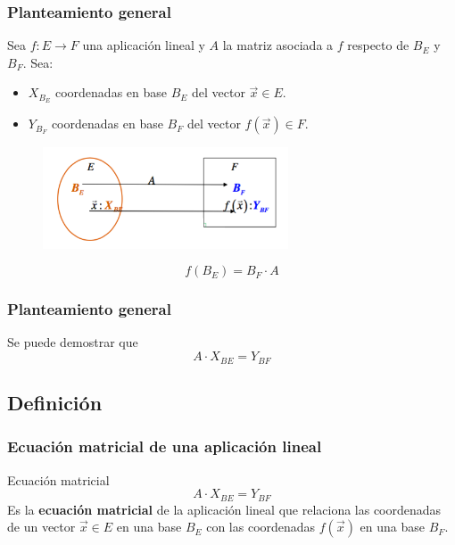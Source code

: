 \documentclass{beamer}
\begin{document}
 
 
    \begin{frame}
  \frametitle{Planteamiento general}
Sea  $f:E\longrightarrow F$ una aplicaci\'on lineal y $A$ la matriz asociada a $f$ respecto de $B_E$ y $B_F$. Sea:
\begin{itemize}
\item $X_{B_E}$ coordenadas en base $B_E$ del vector $\vec x\in E$.
\item $Y_{B_F}$ coordenadas en base $B_F$ del vector $f(\vec x)\in F$.
\end{itemize}

  \begin{figure}[h]
    \label{fig:volumen}
\centering
\includegraphics[height=3cm]{aplicacio_lineal}
\end{figure}
\[f(B_E) = B_F \cdot A\]

 \end{frame}    
 
 
 
  
    \begin{frame}
  \frametitle{Planteamiento general}
Se puede demostrar que 
\[A\cdot X_{BE} = Y_{BF}\]
 \end{frame}    

\subsection{Definici\'on}
  
    \begin{frame}
  \frametitle{Ecuaci\'on matricial de una aplicaci\'on lineal}
\begin{block}{Ecuaci\'on matricial}
\[A\cdot X_{BE} = Y_{BF}\]
Es la \textbf{ecuaci\'on matricial} de la aplicaci\'on lineal que relaciona las coordenadas de un vector $\vec x\in E$ en una base $B_E$ con las coordenadas $f(\vec x)$ en una base $B_F$.
\end{block}
 \end{frame}    
   
\end{document}
